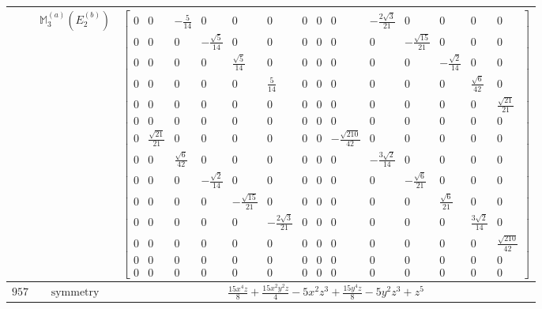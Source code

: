 \documentclass[fleqn,8pt,landscape]{jsarticle}
\begin{document}
\begin{longtable}{ccc}
$  $ & $ \mathbb{M}_{3}^{(a)}(E_{2}^{(b)}) $ & $ \begin{bmatrix} 0 & 0 & - \frac{5}{14} & 0 & 0 & 0 & 0 & 0 & 0 & - \frac{2 \sqrt{3}}{21} & 0 & 0 & 0 & 0 \\ 0 & 0 & 0 & - \frac{\sqrt{5}}{14} & 0 & 0 & 0 & 0 & 0 & 0 & - \frac{\sqrt{15}}{21} & 0 & 0 & 0 \\ 0 & 0 & 0 & 0 & \frac{\sqrt{5}}{14} & 0 & 0 & 0 & 0 & 0 & 0 & - \frac{\sqrt{2}}{14} & 0 & 0 \\ 0 & 0 & 0 & 0 & 0 & \frac{5}{14} & 0 & 0 & 0 & 0 & 0 & 0 & \frac{\sqrt{6}}{42} & 0 \\ 0 & 0 & 0 & 0 & 0 & 0 & 0 & 0 & 0 & 0 & 0 & 0 & 0 & \frac{\sqrt{21}}{21} \\ 0 & 0 & 0 & 0 & 0 & 0 & 0 & 0 & 0 & 0 & 0 & 0 & 0 & 0 \\ 0 & \frac{\sqrt{21}}{21} & 0 & 0 & 0 & 0 & 0 & 0 & - \frac{\sqrt{210}}{42} & 0 & 0 & 0 & 0 & 0 \\ 0 & 0 & \frac{\sqrt{6}}{42} & 0 & 0 & 0 & 0 & 0 & 0 & - \frac{3 \sqrt{2}}{14} & 0 & 0 & 0 & 0 \\ 0 & 0 & 0 & - \frac{\sqrt{2}}{14} & 0 & 0 & 0 & 0 & 0 & 0 & - \frac{\sqrt{6}}{21} & 0 & 0 & 0 \\ 0 & 0 & 0 & 0 & - \frac{\sqrt{15}}{21} & 0 & 0 & 0 & 0 & 0 & 0 & \frac{\sqrt{6}}{21} & 0 & 0 \\ 0 & 0 & 0 & 0 & 0 & - \frac{2 \sqrt{3}}{21} & 0 & 0 & 0 & 0 & 0 & 0 & \frac{3 \sqrt{2}}{14} & 0 \\ 0 & 0 & 0 & 0 & 0 & 0 & 0 & 0 & 0 & 0 & 0 & 0 & 0 & \frac{\sqrt{210}}{42} \\ 0 & 0 & 0 & 0 & 0 & 0 & 0 & 0 & 0 & 0 & 0 & 0 & 0 & 0 \\ 0 & 0 & 0 & 0 & 0 & 0 & 0 & 0 & 0 & 0 & 0 & 0 & 0 & 0 \end{bmatrix} $ \\ \hline
$ 957 $ & $ \text{symmetry} $ & $ \frac{15 x^{4} z}{8} + \frac{15 x^{2} y^{2} z}{4} - 5 x^{2} z^{3} + \frac{15 y^{4} z}{8} - 5 y^{2} z^{3} + z^{5} $ \\

\end{longtable}
\end{document}
